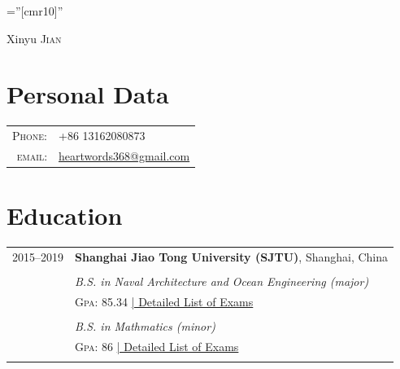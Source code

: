 \documentclass[a4paper,10pt]{article}
\begin{document}

\pagestyle{empty} %

\font\fb=''[cmr10]'' %

\par{\centering
		{\Huge Xinyu \textsc{Jian}
	}\bigskip\par}

\section{Personal Data}

\begin{tabular}{rl}
    \textsc{Phone:}     & +86 13162080873 \\
    \textsc{email:}     & \href{mailto:heartwords368@gmail.com}{heartwords368@gmail.com}
\end{tabular}


\section{Education}
\begin{tabular}{rl}	
  2015--2019 & \textbf{Shanghai Jiao Tong University (SJTU)}, Shanghai, China\\
  \\
 & \emph{B.S. in Naval Architecture and Ocean Engineering (major)}  \\
&\normalsize \textsc{Gpa}: 85.34 \hyperlink{grds}{\hfill | \footnotesize Detailed List of Exams}\\&\\
& \emph{B.S. in Mathmatics (minor)} \\
&\normalsize \textsc{Gpa}: 86 \hyperlink{grds_cleli}{\hfill| \footnotesize Detailed List of Exams}\\&\\

\end{tabular}
\end{document}
